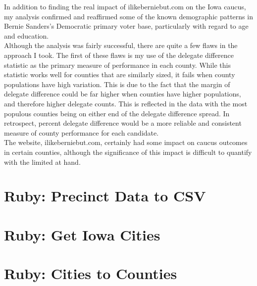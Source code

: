 \documentclass[11pt]{article}
\begin{document}
\begin{multicols}{2}
In addition to finding the real impact of ilikeberniebut.com on the Iowa caucus, my analysis confirmed and reaffirmed some of the known demographic patterns in Bernie Sanders's Democratic primary voter base, particularly with regard to age and education. \\

Although the analysis was fairly successful, there are quite a few flaws in the approach I took. The first of these flaws is my use of the delegate difference statistic as the primary measure of performance in each county. While this statistic works well for counties that are similarly sized, it fails when county populations have high variation. This is due to the fact that the margin of delegate difference could be far higher when counties have higher populations, and therefore higher delegate counts. This is reflected in the data with the most populous counties being on either end of the delegate difference spread. In retrospect, percent delegate difference would be a more reliable and consistent measure of county performance for each candidate. \\

The website, ilikeberniebut.com, certainly had some impact on caucus outcomes in certain counties, although the significance of this impact is difficult to quantify with the limited at hand.

\end{multicols}
\newpage

\setcounter{section}{0}
\renewcommand{\thesection}{\underline{Appendix \Alph{section}}}

\section{Ruby: Precinct Data to CSV}

\newpage

\section{Ruby: Get Iowa Cities}

\newpage

\section{Ruby: Cities to Counties}

\newpage

\end{document}
